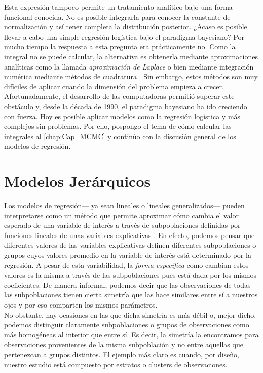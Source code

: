Esta expresión tampoco permite un tratamiento analítico bajo una forma funcional conocida. No es posible integrarla para conocer la constante de normalización y así tener completa la distribución posterior. ¿Acaso es posible llevar a cabo una simple regresión logística bajo el paradigma bayesiano? Por mucho tiempo la respuesta a esta pregunta era prácticamente no. Como la integral no se puede calcular, la alternativa es obtenerla mediante aproximaciones analíticas como la llamada \textit{aproximación de Laplace} o bien mediante integración numérica mediante métodos de cuadratura \parencites{Nieto16,GP97}. Sin embargo, estos métodos son muy difíciles de aplicar cuando la dimensión del problema empieza a crecer.\\ 

Afortunadamente, el desarrollo de las computadoras permitió superar este obstáculo y, desde la década de 1990, el paradigma bayesiano ha ido creciendo con fuerza. Hoy es posible aplicar modelos como la regresión logística y más complejos sin problemas. Por ello, pospongo el tema de cómo calcular las integrales al \autoref{chap:Cap_MCMC} y continúo con la discusión general de los modelos de regresión. 

\section{Modelos Jerárquicos}

Los modelos de regresión--- ya sean lineales o lineales generalizados--- pueden interpretarse como un método que permite aproximar cómo cambia el valor esperado de una variable de interés a través de subpoblaciones definidas por funciones lineales de unas variables explicativas \parencite{GelmanHill06}. En efecto, podemos pensar que diferentes valores de las variables explicativas definen diferentes subpoblaciones o grupos cuyos valores promedio en la variable de interés está determinado por la regresión. A pesar de esta variabilidad, la \textit{forma específica} como cambian estos valores es la misma a través de las subpoblaciones pues está dada por los mismos coeficientes. De manera informal, podemos decir que las observaciones de todas las subpoblaciones tienen cierta simetría que las hace similares entre sí a nuestros ojos y por eso comparten los mismos parámetros.\\ 

No obstante, hay ocasiones en las que dicha simetría es más débil o, mejor dicho, podemos distinguir claramente subpoblaciones o grupos de observaciones como más homogéneas al interior que entre sí. Es decir, la simetría la encontramos para observaciones provenientes de la misma subpoblación y no entre aquellas que pertenezcan a grupos distintos. El ejemplo más claro es cuando, por diseño, nuestro estudio está compuesto por estratos o clusters de observaciones.\\ 

